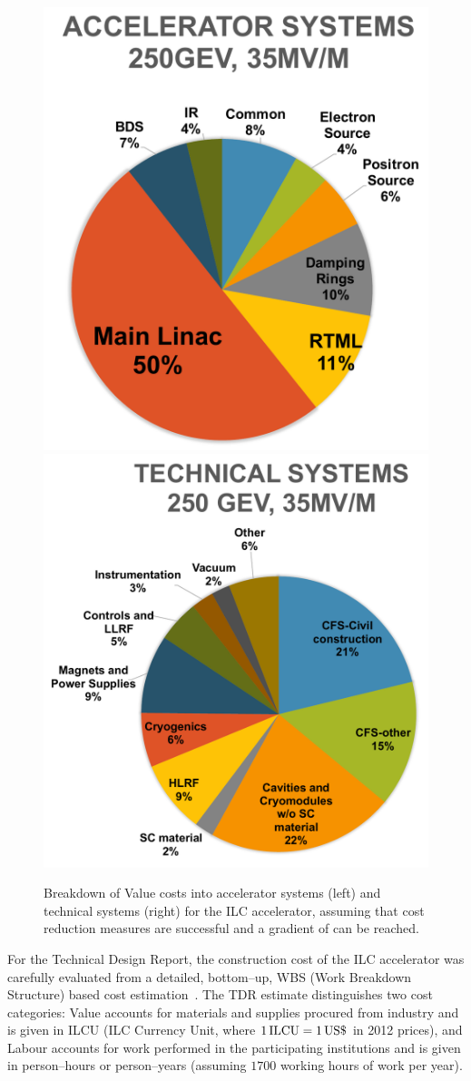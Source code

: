 \begin{figure}[htbp]
 \begin{center}
 \includegraphics[width=0.42\hsize]{chapters/figures/costs-as.pdf}
 \includegraphics[width=0.45\hsize]{chapters/figures/costs-ts.pdf}
\caption{Breakdown of Value costs into accelerator systems (left) and technical systems (right) for the  ILC accelerator, assuming that cost reduction measures are successful and a gradient of  can be reached.
\label{fig:costs}}
 \end{center}
 \end{figure}


%

For the Technical Design Report, the construction cost of the ILC accelerator was carefully evaluated from a detailed, bottom--up, WBS (Work Breakdown Structure) based cost estimation~\cite[Sect. 15]{Adolphsen:2013kya}.
The TDR estimate distinguishes two cost categories: Value accounts for materials and supplies procured from industry and is given in ILCU (ILC Currency Unit, where $1\,{\mathrm{ILCU}} = 1\,{\mathrm{US\$}}$ in 2012 prices), and Labour accounts for work performed in the participating institutions and is given in person--hours or person--years (assuming $1700$ working hours of work per year).

